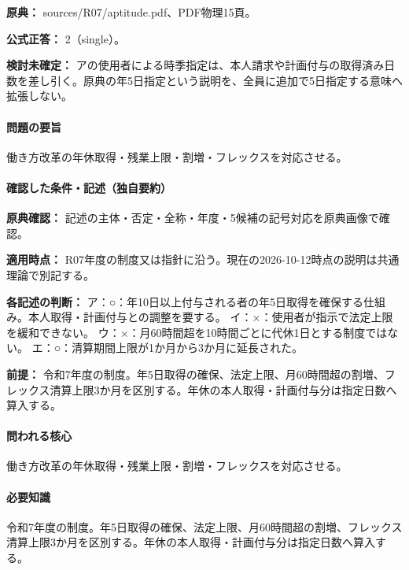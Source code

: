 \noindent\textbf{原典：} sources/R07/aptitude.pdf、PDF物理15頁。

\textbf{公式正答：} 2（single）。

\par\textbf{検討未確定：} アの使用者による時季指定は、本人請求や計画付与の取得済み日数を差し引く。原典の年5日指定という説明を、全員に追加で5日指定する意味へ拡張しない。

\paragraph{問題の要旨} 働き方改革の年休取得・残業上限・割増・フレックスを対応させる。

\paragraph{確認した条件・記述（独自要約）}\mbox{}\par

\noindent\textbf{原典確認：} 記述の主体・否定・全称・年度・5候補の記号対応を原典画像で確認。\par

\noindent\textbf{適用時点：} R07年度の制度又は指針に沿う。現在の2026-10-12時点の説明は共通理論で別記する。\par

\noindent\textbf{各記述の判断：} ア：○：年10日以上付与される者の年5日取得を確保する仕組み。本人取得・計画付与との調整を要する。 イ：×：使用者が指示で法定上限を緩和できない。 ウ：×：月60時間超を10時間ごとに代休1日とする制度ではない。 エ：○：清算期間上限が1か月から3か月に延長された。\par

\noindent\textbf{前提：} 令和7年度の制度。年5日取得の確保、法定上限、月60時間超の割増、フレックス清算上限3か月を区別する。年休の本人取得・計画付与分は指定日数へ算入する。\par

\paragraph{問われる核心} 働き方改革の年休取得・残業上限・割増・フレックスを対応させる。

\paragraph{必要知識} 令和7年度の制度。年5日取得の確保、法定上限、月60時間超の割増、フレックス清算上限3か月を区別する。年休の本人取得・計画付与分は指定日数へ算入する。

